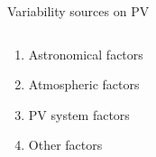 \documentclass{beamer}%
\begin{document}


\begin{frame}[plain]{Variability sources on PV}
  \begin{columns}
    \begin{column}{0.5\textwidth}
  \begin{enumerate}
  \item Astronomical factors  
  \item Atmospheric factors
  \item PV system factors
    \item Other factors
    \end{enumerate}
\end{column}
\begin{column}{0.5\textwidth}    
\end{column}
\end{columns}
\end{frame}
\end{document}
